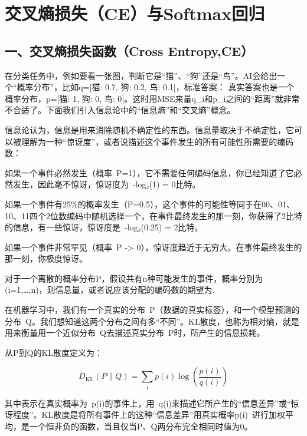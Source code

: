 \clearpage

\hypertarget{ux4ea4ux53c9ux71b5ux635fux5931ceux4e0esoftmaxux56deux5f52}{%
\section{交叉熵损失（CE）与Softmax回归}\label{ux4ea4ux53c9ux71b5ux635fux5931ceux4e0esoftmaxux56deux5f52}}

\hypertarget{ux4e00ux4ea4ux53c9ux71b5ux635fux5931ux51fdux6570cross-entropyce}{%
\subsection{一、交叉熵损失函数（Cross Entropy,CE）}\label{ux4e00ux4ea4ux53c9ux71b5ux635fux5931ux51fdux6570cross-entropyce}}

在分类任务中，例如要看一张图，判断它是``猫''、``狗''还是``鸟''。AI会给出一个``概率分布''，比如q={[}猫: 0.7, 狗: 0.2, 鸟: 0.1{]}，标准答案： 真实答案也是一个概率分布，p={[}猫: 1, 狗: 0, 鸟: 0{]}。这时用MSE来量q\_i和p\_i之间的``距离''就非常不合适了。下面我们引入信息论中的``信息熵''和``交叉熵''概念。

信息论认为，信息是用来消除随机不确定性的东西。信息量取决于不确定性，它可以被理解为一种``惊讶度''，或者说描述这个事件发生的所有可能性所需要的编码数：

如果一个事件必然发生（概率~P=1），它不需要任何编码信息，你已经知道了它必然发生，因此毫不惊讶，惊讶度为~-log₂(1) = 0比特。

如果一个事件有25\%的概率发生（P=0.5），这个事件的可能性等同于在00、01、10、11四个2位数编码中随机选择一个，在事件最终发生的那一刻，你获得了2比特的信息，有一些惊讶，惊讶度是~-log₂(0.25) = 2比特。

如果一个事件非常罕见（概率~P -\textgreater{} 0），惊讶度趋近于无穷大。在事件最终发生的那一刻，你极度惊讶。

对于一个离散的概率分布P，假设共有n种可能发生的事件，概率分别为(i=1,\ldots,n)，则信息量，或者说应该分配的编码数的期望为.

在机器学习中，我们有一个真实的分布~P（数据的真实标签），和一个模型预测的分布~Q。我们想知道这两个分布之间有多``不同''。KL散度，也称为相对熵，就是用来衡量用一个近似分布~Q去描述真实分布~P时，所产生的信息损耗。

从P到Q的KL散度定义为：

\[
D_{\mathrm{KL}}(P \parallel Q)=\sum_i p(i)\log\left(\frac{p(i)}{q(i)}\right)
\]

其中表示在真实概率为~p(i)的事件上，用~q(i)来描述它所产生的``信息差异''或``惊讶程度''。KL散度是将所有事件上的这种``信息差异''用真实概率p(i)~进行加权平均，是一个恒非负的函数，当且仅当P、Q两分布完全相同时值为0。


